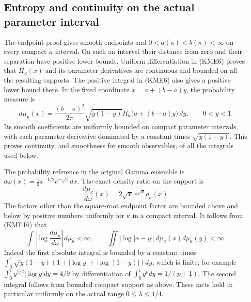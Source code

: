\subsection{Entropy and continuity on the actual parameter interval}
The endpoint proof gives smooth endpoints and $0<a(\kappa)<b(\kappa)<\infty$
on every compact $\kappa$ interval. On such an interval their distance from
zero and their separation have positive lower bounds. Uniform
differentiation in (KME6) proves that $H_\kappa(x)$ and its parameter
derivatives are continuous and bounded on all the resulting supports.
The positive integral in (KME6) also gives a positive lower bound there.
In the fixed coordinate $x=a+(b-a)y$, the probability measure is
\begin{equation}\tag{KME16}
 d\mu_\kappa(x)=\frac{(b-a)^2}{2\pi}\sqrt{y(1-y)}
           H_\kappa\bigl(a+(b-a)y\bigr)\,dy,\qquad 0<y<1.
\end{equation}
Its smooth coefficients are uniformly bounded on compact parameter
intervals, with each parameter derivative dominated by a constant times
$\sqrt{y(1-y)}$.  This proves continuity, and smoothness for smooth
observables, of all the integrals used below.

The probability reference in the original Gamma ensemble is
$d\omega(x)=\tfrac12x^{-1/2}e^{-\sqrt x}dx$.
The exact density ratio on the support is
\begin{equation}\tag{KME17}
 \frac{d\mu_\kappa}{d\omega}(x)=2\sqrt x\,e^{\sqrt x}\rho_\kappa(x).
\end{equation}
The factors other than the square-root endpoint factor are bounded
above and below by positive numbers uniformly for $\kappa$ in a compact
interval.  It follows from (KME16) that
\[
 \int\left|\log\frac{d\mu_\kappa}{d\omega}\right|\,d\mu_\kappa<\infty,
 \qquad
 \iint|\log|x-y||\,d\mu_\kappa(x)d\mu_\kappa(y)<\infty.
\]
Indeed the first absolute integral is bounded by a constant times
$\int_0^1\sqrt{y(1-y)}
(1+|\log y|+|\log(1-y)|)dy$, which is finite; for example
$\int_0^1y^{1/2}|\log y|dy=4/9$ by differentiation of
$\int_0^1y^pdy=1/(p+1)$. The second integral follows from bounded
compact support as above. These facts hold in particular uniformly
on the actual range $0\leq\lambda\leq1/4$.


